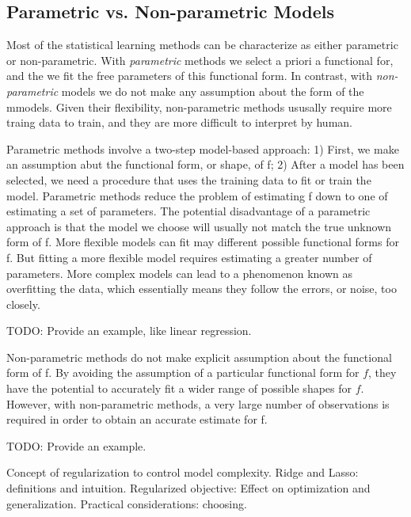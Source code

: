 
\subsection{Parametric vs. Non-parametric Models}

Most of the statistical learning methods can be characterize as either parametric or non-parametric. With \emph{parametric} methods we select a priori a functional for, and the we fit the free parameters of this functional form. In contrast, with \emph{non-parametric} models we do not make any assumption about the form of the mmodels. Given their flexibility, non-parametric methods ususally require more traing data to train, and they are more difficult to interpret by human.

{\color{red} Parametric methods involve a two-step model-based approach: 1) First, we make an assumption abut the functional form, or shape, of f; 2) After a model has been selected, we need a procedure that uses the training data to fit or train the model. Parametric methods reduce the problem of estimating f down to one of estimating a set of parameters. The potential disadvantage of a parametric approach is that the model we choose will usually not match the true unknown form of f. More flexible models can fit may different possible functional forms for f. But fitting a more flexible model requires estimating a greater number of parameters. More complex models can lead to a phenomenon known as overfitting the data, which essentially means they follow the errors, or noise, too closely.}

{\color{red} TODO: Provide an example, like linear regression.}

{\color{red} Non-parametric methods do not make explicit assumption about the functional form of f. By avoiding the assumption of a particular functional form for $f$, they have the potential to accurately fit a wider range of possible shapes for $f$. However, with non-parametric methods, a very large number of observations is required in order to obtain an accurate estimate for f.}

{\color{red} TODO: Provide an example.}


{\color{red} Concept of regularization to control model complexity. Ridge and Lasso: definitions and intuition. Regularized objective: Effect on optimization and generalization. Practical considerations: choosing.}

